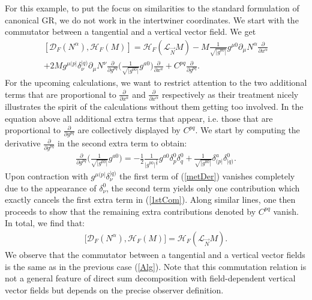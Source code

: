 \documentclass[a4paper,12pt, DIV=14, BCOR=5mm, twoside, headsepline, numbers=noenddot]{scrbook}
\begin{document}
For this example, to put the focus on similarities to the standard formulation of canonical GR, we do not work in the intertwiner coordinates. We start with the commutator between a  tangential and a vertical vector field.
We get 
\begin{multline}\label{1stCom}
    \left[ \mathcal{D}_F(N^{\alpha}) , \mathcal{H}_F(M) \right] = \mathcal{H}_F(\mathcal{L}_{\vec{N}}M) - M \frac{1}{\sqrt{\vert g^{00} \vert }} g^{\mu0} \partial_{\mu} N^{\alpha} \frac{\partial}{\partial x^{\alpha}} \\
    +2M g^{\mu (p\vert} \delta^{\vert q)}_{\nu} \partial_{\mu} N^{\nu} \frac{\partial}{\partial g ^{pq}} \biggl(\frac{1}{\sqrt{\vert g^{00} \vert }} g^{a0} \biggr) \frac{\partial}{\partial x^a} + C^{pq} \frac{\partial}{\partial g^{pq}}.
\end{multline}
For the upcoming calculations, we want to restrict attention to the two additional terms that are proportional to $\frac{\partial}{\partial x^a}$ and $\frac{\partial}{\partial x^{\alpha}}$ respectively as their treatment nicely illustrates the spirit of the calculations without them getting too involved. In the equation above all additional extra terms that appear, i.e. those that are proportional to $\frac{\partial}{\partial g^{pq}}$ are collectively displayed by $C^{pq}$. We start by computing the derivative $\frac{\partial}{\partial g^{pq}}$ in the second extra term to obtain:
\begin{align}\label{metDer}
    \frac{\partial}{\partial g ^{pq}} \biggl (\frac{1}{\sqrt{\vert g^{00} \vert }} g^{a0} \biggr) = -\frac{1}{2} \frac{1}{\vert g^{00} \vert^{\frac{3}{2}}} g^{a0} \delta^0_p \delta^0_q +  \frac{1}{\sqrt{\vert g^{00} \vert }} \delta^a_{(p \vert} \delta^0 _{\vert q)}. 
\end{align}
Upon contraction with $g^{\mu ( p \vert} \delta ^{\vert q)}_{\nu}$ the first term of (\ref{metDer}) vanishes completely due to the appearance of $\delta^0_{\nu}$, the second term yields only one contribution which exactly cancels the first extra term in (\ref{1stCom}). Along similar lines, one then proceeds to show that the remaining extra contributions denoted by $C^{pq}$ vanish. In total, we find that:
\begin{align}\label{FDH}
    \bigl[ \mathcal{D}_F(N^{\alpha}) , \mathcal{H}_F(M) \bigr] = \mathcal{H}_F(\mathcal{L}_{\vec{N}}M).
\end{align}
We observe that the commutator between a tangential and a vertical vector fields is the same as in the previous case (\ref{Alg}).
Note that this commutation relation is not a general feature of direct sum decomposition with field-dependent vertical vector fields but depends on the precise observer definition. 
\end{document}
